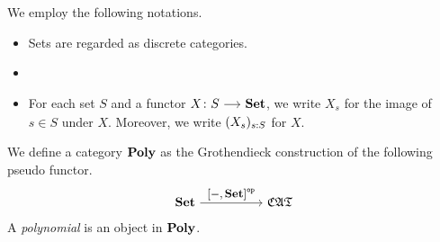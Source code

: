 \documentclass[a4paper,dvipsnames, 11pt]{amsart}
\begin{document}
\maketitle
\begin{notation}
	We employ the following notations.
	\begin{itemize}
		\item %
			Sets are regarded as discrete categories.
		\item %
		\item %
			For each set $S$ and a functor $X\colon S\arr\Set$,
			we write $X_s$ for the image of $s\in S$ under $X$.
			Moreover, we write $(X_s)_{s: S}$ for $X$.
	\end{itemize}
\end{notation}
\begin{definition}
	We define a category $\mathbf{Poly}$ as the Grothendieck construction of the following pseudo functor.
	\[
		\Set
		\arr"\left[-,\Set\right]^\op"[][5]
		\CATbi
	\]
	A \emph{polynomial} is an object in $\mathbf{Poly}$.
\end{definition}



\end{document}
